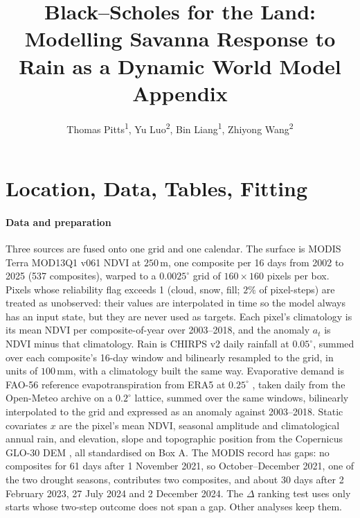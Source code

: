 \documentclass[letterpaper]{article} %
\title{Black--Scholes for the Land:\\ Modelling Savanna Response to Rain as a Dynamic World Model\\ Appendix}
\author{
    Thomas Pitts\textsuperscript{\rm 1},
    Yu Luo\textsuperscript{\rm 2},
    Bin Liang\textsuperscript{\rm 1},
    Zhiyong Wang\textsuperscript{\rm 2}
}
\begin{document}
\maketitle

\section{Location, Data, Tables, Fitting}
\paragraph{Data and preparation} Three sources are fused onto one grid and one calendar. The surface is MODIS Terra MOD13Q1 v061 NDVI \citep{mod13} at $250$\,m, one composite per 16 days from 2002 to 2025 (537 composites), warped to a $0.0025^\circ$ grid of $160\times160$ pixels per box. Pixels whose reliability flag exceeds 1 (cloud, snow, fill; $2\%$ of pixel-steps) are treated as unobserved: their values are interpolated in time so the model always has an input state, but they are never used as targets. Each pixel's climatology is its mean NDVI per composite-of-year over 2003--2018, and the anomaly $a_t$ is NDVI minus that climatology. Rain is CHIRPS v2 daily rainfall \citep{chirps} at $0.05^\circ$, summed over each composite's 16-day window and bilinearly resampled to the grid, in units of $100$\,mm, with a climatology built the same way. Evaporative demand is FAO-56 reference evapotranspiration \citep{allen1998} from ERA5 at $0.25^\circ$ \citep{hersbach2020}, taken daily from the Open-Meteo archive on a $0.2^\circ$ lattice, summed over the same windows, bilinearly interpolated to the grid and expressed as an anomaly against 2003--2018. Static covariates $x$ are the pixel's mean NDVI, seasonal amplitude and climatological annual rain, and elevation, slope and topographic position from the Copernicus GLO-30 DEM \citep{copdem}, all standardised on Box A. The MODIS record has gaps: no composites for 61 days after 1 November 2021, so October--December 2021, one of the two drought seasons, contributes two composites, and about 30 days after 2 February 2023, 27 July 2024 and 2 December 2024. The $\Delta$ ranking test uses only starts whose two-step outcome does not span a gap. Other analyses keep them.
\end{document}
